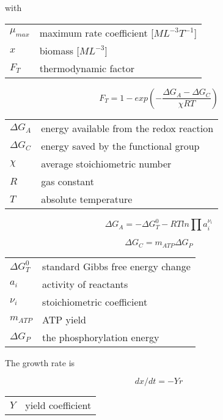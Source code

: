 \documentclass[12pt, a4paper]{article}
\begin{document}
with
\\
\begin{tabular}{ll}
$\mu_{max}$ & maximum rate coefficient [$ML^{-3}T^{-1}$] \\
$x$ & biomass [$ML^{-3}$] \\
$F_{T}$ & thermodynamic factor \\
\end{tabular}

\begin{equation}  
F_T = 1 - exp\left(-\frac{\Delta G_A - \Delta G_C}{\chi RT}\right)
\end{equation}

\begin{tabular}{ll}
$\Delta G_A$ & energy available from the redox reaction \\
$\Delta G_C$ & energy saved by the functional group \\
$\chi$ & average stoichiometric number \\
$R$ & gas constant \\
$T$ & absolute temperature \\
\end{tabular}

\begin{equation}  
\Delta G_A = - \Delta G_T^0 - RT ln\prod{a_i^{\nu_i}}
\end{equation}

\begin{equation}  
\Delta G_C = m_{ATP} \Delta G_P
\end{equation}

\begin{tabular}{ll}
$\Delta G_T^0$ & standard Gibbs free energy change \\
$a_i$ & activity of reactants \\
$\nu_i$ & stoichiometric coefficient \\
$m_{ATP}$ & ATP yield \\
$\Delta G_P$ & the phosphorylation energy \\
\end{tabular}

The growth rate is

\begin{equation}  
dx/dt = -Yr
\end{equation}

\begin{tabular}{ll}
$Y$ & yield coefficient \\
\end{tabular}
\end{document}
